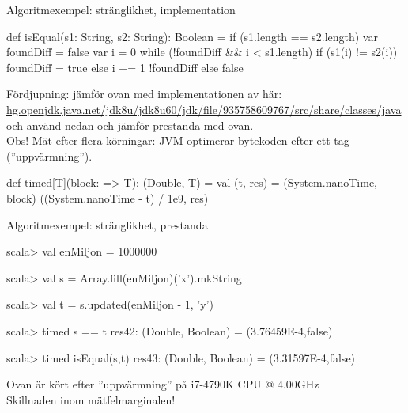 \begin{Slide}{Algoritmexempel: stränglikhet, implementation}\SlideFontSmall
\begin{Code}
def isEqual(s1: String, s2: String): Boolean = {
  if (s1.length == s2.length) {
    var foundDiff = false
    var i = 0
    while (!foundDiff && i < s1.length) {
      if (s1(i) != s2(i)) foundDiff = true
      else i += 1
    }
    !foundDiff
  } else false
}
\end{Code}
\pause
{\SlideFontTiny Fördjupning: jämför ovan med implementationen av  här:
\href{http://hg.openjdk.java.net/jdk8u/jdk8u60/jdk/file/935758609767/src/share/classes/java/lang/String.java#l976}{hg.openjdk.java.net/jdk8u/jdk8u60/jdk/file/935758609767/src/share/classes/java} \\ och använd  nedan och jämför prestanda med  ovan.\\
Obs! Mät efter flera körningar: JVM optimerar bytekoden efter ett tag (''uppvärmning'').}

\vspace{-0.25em}\begin{Code}
def timed[T](block: => T): (Double, T) = {
  val (t, res) = (System.nanoTime, block)
  ((System.nanoTime - t) / 1e9, res)
}
\end{Code}

\end{Slide}

\begin{Slide}{Algoritmexempel: stränglikhet, prestanda}
\begin{REPL}
scala> val enMiljon = 1000000

scala> val s = Array.fill(enMiljon)('x').mkString

scala> val t = s.updated(enMiljon - 1, 'y')

scala> timed { s == t }
res42: (Double, Boolean) = (3.76459E-4,false)

scala> timed { isEqual(s,t) }
res43: (Double, Boolean) = (3.31597E-4,false)
\end{REPL}
Ovan är kört efter ''uppvärmning'' på i7-4790K CPU @ 4.00GHz \\
Skillnaden inom mätfelmarginalen!
\end{Slide}



